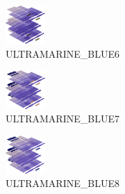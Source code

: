 \hspace{0.1cm}
\begin{minipage}[b]{0.15\linewidth}
\begin{figure}[H]                                                          
  \centering                                                             
  \begin{adjustbox}{width=1.5cm,center}                                   
  \includegraphics[width=1.5cm]{src/colorspace_colourflow/flows/colourflow_118-45.png}%
  \end{adjustbox}                                                        
\caption*{ULTRAMARINE\_BLUE6}                                           
\end{figure}                                                               
\end{minipage}
\hspace{0.1cm}
\begin{minipage}[b]{0.15\linewidth}
\begin{figure}[H]                                                          
  \centering                                                             
  \begin{adjustbox}{width=1.5cm,center}                                   
  \includegraphics[width=1.5cm]{src/colorspace_colourflow/flows/colourflow_119-45.png}%
  \end{adjustbox}                                                        
\caption*{ULTRAMARINE\_BLUE7}                                           
\end{figure}                                                               
\end{minipage}
\hspace{0.1cm}
\begin{minipage}[b]{0.15\linewidth}
\begin{figure}[H]                                                          
  \centering                                                             
  \begin{adjustbox}{width=1.5cm,center}                                   
  \includegraphics[width=1.5cm]{src/colorspace_colourflow/flows/colourflow_120-45.png}%
  \end{adjustbox}                                                        
\caption*{ULTRAMARINE\_BLUE8}                                           
\end{figure}                                                               
\end{minipage}
